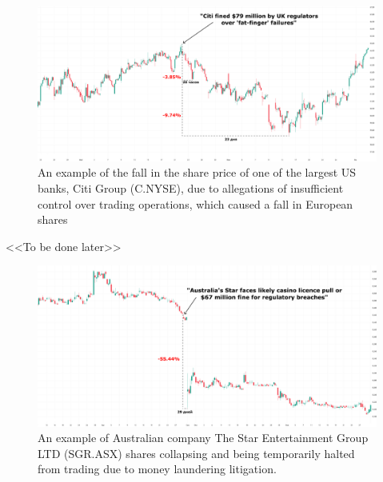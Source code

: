 \begin{figure}[H]
    \centering
    \includegraphics[width=1\linewidth]{img/citi_group.png}
    \caption{An example of the fall in the share price of one of the largest US banks, Citi Group
    (C.NYSE), due to allegations of insufficient control over trading operations, which caused
    a fall in European shares}
    \label{fig:citi_group}
\end{figure}

<<To be done later>>

\begin{figure}[H]
    \centering
    \includegraphics[width=1\linewidth]{img/star_entertainment.png}
    \caption{An example of Australian company The Star Entertainment Group LTD (SGR.ASX) shares
    collapsing and being temporarily halted from trading due to money laundering litigation.}
    \label{fig:star_entertainment}
\end{figure}
